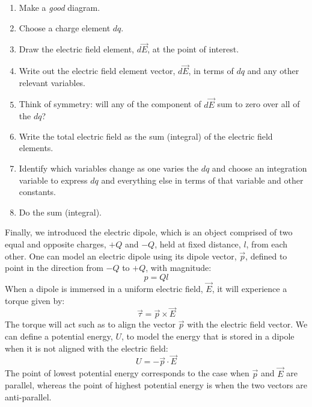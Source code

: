 \begin{enumerate}
\item Make a \textit{good} diagram.
\item Choose a charge element $dq$.
\item Draw the electric field element, $d\vec E$, at the point of interest.
\item Write out the electric field element vector, $d\vec E$, in terms of $dq$ and any other relevant variables.
\item Think of symmetry: will any of the component of $d\vec E$ sum to zero over all of the $dq$?
\item Write the total electric field as the sum (integral) of the electric field elements.
\item Identify which variables change as one varies the $dq$ and choose an integration variable to express $dq$ and everything else in terms of that variable and other constants.
\item Do the sum (integral).
\end{enumerate}

Finally, we introduced the electric dipole, which is an object comprised of two equal and opposite charges, $+Q$ and $-Q$, held at fixed distance, $l$, from each other. One can model an electric dipole using its dipole vector, $\vec p$, defined to point in the direction from $-Q$ to $+Q$, with magnitude:
\begin{equation}
p=Ql
\end{equation}
When a dipole is immersed in a uniform electric field, $\vec E$, it will experience a torque given by:
\begin{equation}
\vec\tau=\vec p\times \vec E
\end{equation}
The torque will act such as to align the vector $\vec p$ with the electric field vector. We can define a potential energy, $U$, to model the energy that is stored in a dipole when it is not aligned with the electric field:
\begin{equation}
U=-\vec p \cdot \vec E
\end{equation}
The point of lowest potential energy corresponds to the case when $\vec p$ and $\vec E$ are parallel, whereas the point of highest potential energy is when the two vectors are anti-parallel.

